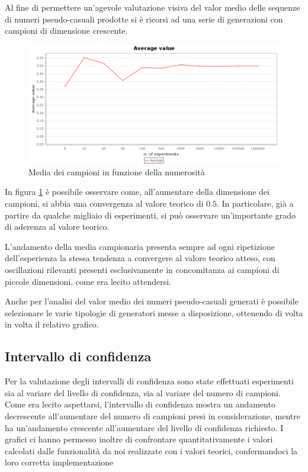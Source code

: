 Al fine di permettere un'agevole valutazione visiva del valor medio delle sequenze di numeri pseudo-casuali prodotte si \`e ricorsi ad una serie di generazioni con campioni di dimensione crescente.

\begin{figure}[!h]{
	\begin{center}
	   \includegraphics[width=0.95	\textwidth]{figures/average.png}
	\end{center}}
	\caption{Media dei campioni in funzione della numerosit\`a}
	\label{fig:avg}
\end{figure}

In figura \ref{fig:avg} \`e possibile osservare come, all'aumentare della dimensione dei campioni, si abbia una convergenza al valore teorico di $0.5$.
In particolare, gi\`a a partire da qualche migliaio di esperimenti, si pu\`o osservare un'importante grado di aderenza al valore teorico. 

L'andamento della media campionaria presenta sempre ad ogni ripetizione dell'esperienza la stessa tendenza a convergere al valore teorico atteso, con oscillazioni rilevanti presenti esclusivamente in concomitanza ai campioni di piccole dimensioni, come era lecito attendersi.

Anche per l'analisi del valor medio dei numeri pseudo-casuali generati \`e possibile selezionare le varie tipologie di generatori messe a disposizione, ottenendo di volta in volta il relativo grafico.

\subsection{Intervallo di confidenza}

Per la valutazione degli intervalli di confidenza sono state effettuati esperimenti sia al variare del livello di confidenza, sia al variare del numero di campioni. 
Come era lecito aspettarsi, l'intervallo di confidenza mostra un andamento decrescente all'aumentare del numero di campioni presi in considerazione, mentre ha un'andamento crescente all'aumentare del livello di confidenza richiesto.
I grafici ci hanno permesso inoltre di confrontare quantitativamente i valori calcolati dalle funzionalit\`a da noi realizzate con i valori teorici, confermandoci la loro corretta implementazione

